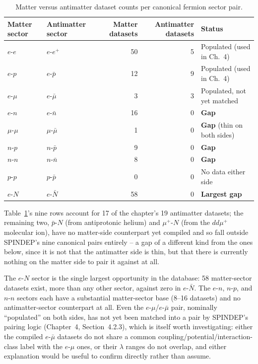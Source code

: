 \documentclass[main]{subfiles}
\begin{document}
\begin{table}[h]
\centering
\begin{tabular}{@{}llrrl@{}}
\toprule
Matter sector & Antimatter sector & Matter datasets & Antimatter datasets & Status \\
\midrule
$e$-$e$     & $e$-$e^+$      & 50 & 5 & Populated (used in Ch.~4) \\
$e$-$p$     & $e$-$\bar p$   & 12 & 9 & Populated (used in Ch.~4) \\
$e$-$\mu$   & $e$-$\bar\mu$  & 3  & 3 & Populated, not yet matched \\
$e$-$n$     & $e$-$\bar n$   & 16 & 0 & \textbf{Gap} \\
$\mu$-$\mu$ & $\mu$-$\bar\mu$& 1  & 0 & \textbf{Gap} (thin on both sides) \\
$n$-$p$     & $n$-$\bar p$   & 9  & 0 & \textbf{Gap} \\
$n$-$n$     & $n$-$\bar n$   & 8  & 0 & \textbf{Gap} \\
$p$-$p$     & $p$-$\bar p$   & 0  & 0 & No data either side \\
$e$-$N$     & $e$-$\bar N$   & 58 & 0 & \textbf{Largest gap} \\
\bottomrule
\end{tabular}
\caption{Matter versus antimatter dataset counts per canonical fermion sector pair.}
\label{tab:sector-gaps}
\end{table}

Table~\ref{tab:sector-gaps}'s nine rows account for 17 of the chapter's 19
antimatter datasets; the remaining two, $\bar p$-$N$ (from antiprotonic
helium) and $\mu^+$-$N$ (from the $dd\mu^+$ molecular ion), have no
matter-side counterpart yet compiled and so fall outside SPINDEP's nine
canonical pairs entirely -- a gap of a different kind from the ones below,
since it is not that the antimatter side is thin, but that there is
currently nothing on the matter side to pair it against at all.

The $e$-$N$ sector is the single largest opportunity in the database: 58
matter-sector datasets exist, more than any other sector, against zero in
$e$-$\bar N$. The $e$-$n$, $n$-$p$, and $n$-$n$ sectors each have a
substantial matter-sector base (8--16 datasets) and no antimatter-sector
counterpart at all. Even the $e$-$\mu$/$e$-$\bar\mu$ pair, nominally
``populated'' on both sides, has not yet been matched into a pair by
SPINDEP's pairing logic (Chapter~4, Section~4.2.3), which is itself worth
investigating: either the compiled $e$-$\bar\mu$ datasets do not share a
common coupling/potential/interaction-class label with the $e$-$\mu$ ones,
or their $\lambda$ ranges do not overlap, and either explanation would be
useful to confirm directly rather than assume.
\end{document}
